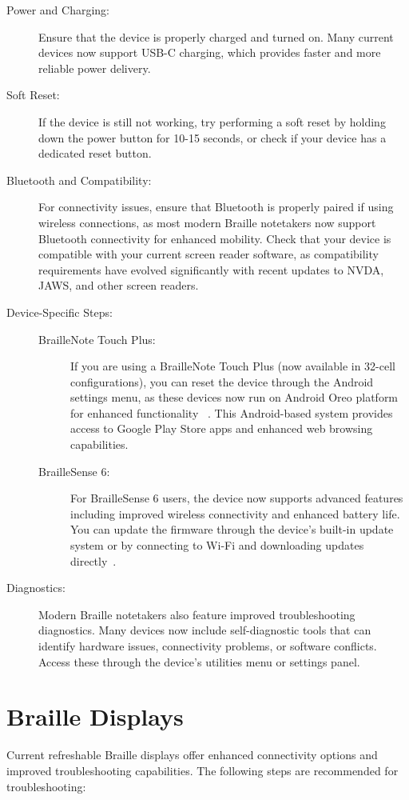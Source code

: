 \begin{description}
    \item[Power and Charging:] Ensure that the device is properly charged and turned on. Many current devices now support USB-C charging, which provides faster and more reliable power delivery.
    \item[Soft Reset:] If the device is still not working, try performing a soft reset by holding down the power button for 10-15 seconds, or check if your device has a dedicated reset button.
    \item[Bluetooth and Compatibility:] For connectivity issues, ensure that Bluetooth is properly paired if using wireless connections, as most modern Braille notetakers now support Bluetooth connectivity for enhanced mobility. Check that your device is compatible with your current screen reader software, as compatibility requirements have evolved significantly with recent updates to NVDA, JAWS, and other screen readers.
    \item[Device-Specific Steps:]
    \begin{description}
        \item[BrailleNote Touch Plus:] If you are using a BrailleNote Touch Plus (now available in 32-cell configurations), you can reset the device through the Android settings menu, as these devices now run on Android Oreo platform for enhanced functionality~ \cite{BrailleNoteTouchPlus32}. This Android-based system provides access to Google Play Store apps and enhanced web browsing capabilities.
        \item[BrailleSense 6:] For BrailleSense 6 users, the device now supports advanced features including improved wireless connectivity and enhanced battery life. You can update the firmware through the device's built-in update system or by connecting to Wi-Fi and downloading updates directly~\cite{BrailleSense6}.
    \end{description}
    \item[Diagnostics:] Modern Braille notetakers also feature improved troubleshooting diagnostics. Many devices now include self-diagnostic tools that can identify hardware issues, connectivity problems, or software conflicts. Access these through the device's utilities menu or settings panel.
\end{description}

\section{Braille Displays}
\label{display2}
Current refreshable Braille displays offer enhanced connectivity options and improved troubleshooting capabilities. The following steps are recommended for troubleshooting:

